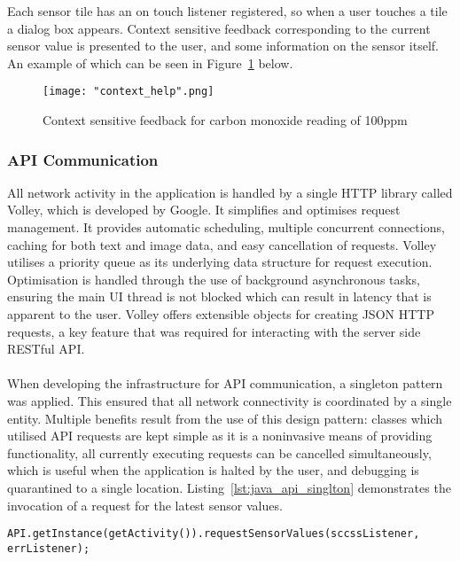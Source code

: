 \documentclass{article}
\begin{document}
\noindent
Each sensor tile has an on touch listener registered, so when a user touches a tile a dialog box appears. Context sensitive feedback corresponding to the current sensor value is presented to the user, and some information on the sensor itself. An example of which can be seen in Figure~\ref{fig:android_sensor_context_help} below.
\begin{figure}[H]
\centering
\texttt{[image: "context\_help".png]}
\caption{Context sensitive feedback for carbon monoxide reading of 100ppm}
\label{fig:android_sensor_context_help}
\end{figure}

\subsubsection{API Communication}
All network activity in the application is handled by a single HTTP library called Volley, which is developed by Google. It simplifies and optimises request management. It provides automatic scheduling, multiple concurrent connections, caching for both text and image data, and easy cancellation of requests. Volley utilises a priority queue as its underlying data structure for request execution. Optimisation is handled through the use of background asynchronous tasks, ensuring the main UI thread is not blocked which can result in latency that is apparent to the user. Volley offers extensible objects for creating JSON HTTP requests, a key feature that was required for interacting with the server side RESTful API.	\\\\
When developing the infrastructure for API communication, a singleton pattern was applied. This ensured that all network connectivity is coordinated by a single entity. Multiple benefits result from the use of this design pattern: classes which utilised API requests are kept simple as it is a noninvasive means of providing functionality, all currently executing requests can be cancelled simultaneously, which is useful when the application is halted by the user, and debugging is quarantined to a single location. Listing~\ref{lst:java_api_singlton} demonstrates the invocation of a request for the latest sensor values. 

\begin{lstlisting}[caption={Singleton API object method invocation},label={lst:java_api_singlton}]
API.getInstance(getActivity()).requestSensorValues(sccssListener, errListener);
\end{lstlisting}
\end{document}
